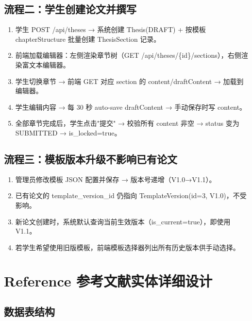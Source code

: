 \documentclass{../softeng}
\begin{document}
\subsection{流程二：学生创建论文并撰写}

\begin{enumerate}
    \item 学生 POST /api/theses → 系统创建 Thesis(DRAFT) + 按模板 chapterStructure 批量创建 ThesisSection 记录。
    \item 前端加载编辑器：左侧渲染章节树（GET /api/theses/\{id\}/sections），右侧渲染富文本编辑器。
    \item 学生切换章节 → 前端 GET 对应 section 的 content/draftContent → 加载到编辑器。
    \item 学生编辑内容 → 每 30 秒 auto-save draftContent → 手动保存时写 content。
    \item 全部章节完成后，学生点击"提交" → 校验所有 content 非空 → status 变为 SUBMITTED → is\_locked=true。
\end{enumerate}

\subsection{流程三：模板版本升级不影响已有论文}

\begin{enumerate}
    \item 管理员修改模板 JSON 配置并保存 → 版本号递增（V1.0→V1.1）。
    \item 已有论文的 template\_version\_id 仍指向 TemplateVersion(id=3, V1.0)，不受影响。
    \item 新论文创建时，系统默认查询当前生效版本（is\_current=true），即使用 V1.1。
    \item 若学生希望使用旧版模板，前端模板选择器列出所有历史版本供手动选择。
\end{enumerate}

\section{Reference 参考文献实体详细设计}

\subsection{数据表结构}
\end{document}
